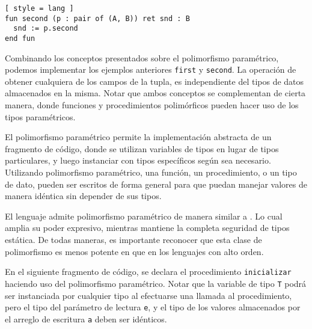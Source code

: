 \begin{lstlisting}[ style = lang ]
fun second (p : pair of (A, B)) ret snd : B
  snd := p.second
end fun
\end{lstlisting}

Combinando los conceptos presentados sobre el polimorfismo paramétrico, podemos implementar los ejemplos anteriores \lstinline[style = lang]{first} y \lstinline[style = lang]{second}.
La operación de obtener cualquiera de los campos de la tupla, es independiente del tipos de datos almacenados en la misma.
Notar que ambos conceptos se complementan de cierta manera, donde funciones y procedimientos polimórficos pueden hacer uso de los tipos paramétricos.

\iffalse
El lenguaje admite polimorfismo paramétrico de manera similar a \Haskell{}.
Lo cual amplia su poder expresivo, mientras mantiene la completa seguridad de tipos estática.
De todas maneras, es importante reconocer que esta clase de polimorfismo es menos potente en \Lenguaje{} que en los lenguajes con alto orden.
%
Personalmente no diría "es importante reconocer" porque suena a que intentamos vender algo que después resultó no ser así. Pero si haría notar esto: el lenguaje tiene polimorfismo, genial... eso nos permite escribir funciones generales, pero (no lo diría así) nuestro lenguaje no tiene en su sistema de tipos el tipo flecha. Por lo tanto, un argumento con tipo variable de tipo no permite pasar una función como parámetro, pero tampoco podíamos antes incluso fijando tipos concretos.
%
\fi

\iffalse
El polimorfismo paramétrico permite la implementación abstracta de un fragmento de código, donde se utilizan variables de tipos en lugar de tipos particulares, y luego instanciar con tipos específicos según sea necesario.
Utilizando polimorfismo paramétrico, una función, un procedimiento, o un tipo de dato, pueden ser escritos de forma general para que puedan manejar valores de manera idéntica sin depender de sus tipos.

El lenguaje admite polimorfismo paramétrico de manera similar a \Haskell{}.
Lo cual amplia su poder expresivo, mientras mantiene la completa seguridad de tipos estática.
De todas maneras, es importante reconocer que esta clase de polimorfismo es menos potente en \Lenguaje{} que en los lenguajes con alto orden.

En el siguiente fragmento de código, se declara el procedimiento \lstinline[style = lang]{inicializar} haciendo uso del polimorfismo paramétrico.
Notar que la variable de tipo \lstinline[style = lang]{T} podrá ser instanciada por cualquier tipo al efectuarse una llamada al procedimiento, pero el tipo del parámetro de lectura \lstinline[style = lang]{e}, y el tipo de los valores almacenados por el arreglo de escritura \lstinline[style = lang]{a} deben ser idénticos.

